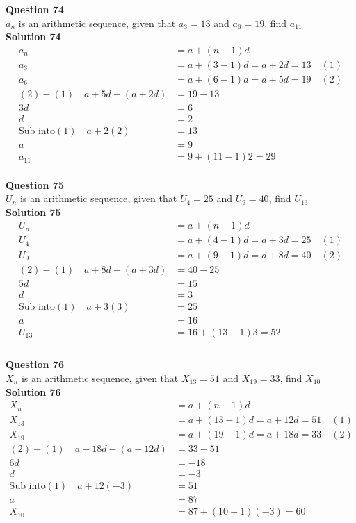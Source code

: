 \documentclass{article}
\begin{document}
\noindent\textbf{Question 74}\\[5pt]
$a_n$ is an arithmetic sequence, given that $a_3=13$ and $a_6=19$, find $a_{11}$\\[5pt]
\noindent\textbf{Solution 74}\\[5pt]
\begin{align*}
a_n&=a+(n-1)d\\[2pt]
a_3&=a+(3-1)d=a+2d=13\quad (1)\\[2pt]
a_6&=a+(6-1)d=a+5d=19\quad (2)\\[2pt]
(2)-(1)\quad a+5d-(a+2d)&=19-13\\[2pt]
3d&=6\\[2pt]
d&=2\\[12pt]
\text{Sub into} (1) \quad a+2(2)&=13\\[2pt]
a&=9\\[12pt]
a_{11}&=9+(11-1)2=29
\end{align*}\\[10pt]

\noindent\textbf{Question 75}\\[5pt]
$U_n$ is an arithmetic sequence, given that $U_4=25$ and $U_9=40$, find $U_{13}$\\[5pt]
\noindent\textbf{Solution 75}\\[5pt]
\begin{align*}
U_n&=a+(n-1)d\\[2pt]
U_4&=a+(4-1)d=a+3d=25\quad (1)\\[2pt]
U_9&=a+(9-1)d=a+8d=40\quad (2)\\[2pt]
(2)-(1)\quad a+8d-(a+3d)&=40-25\\[2pt]
5d&=15\\[2pt]
d&=3\\[12pt]
\text{Sub into} (1) \quad a+3(3)&=25\\[2pt]
a&=16\\[12pt]
U_{13}&=16+(13-1)3=52\\[-40pt]
\end{align*}\\[10pt]

\noindent\textbf{Question 76}\\[5pt]
$X_n$ is an arithmetic sequence, given that $X_{13}=51$ and $X_{19}=33$, find $X_{10}$\\[5pt]
\noindent\textbf{Solution 76}\\[5pt]
\begin{align*}
X_n&=a+(n-1)d\\[2pt]
X_{13}&=a+(13-1)d=a+12d=51\quad (1)\\[2pt]
X_{19}&=a+(19-1)d=a+18d=33\quad (2)\\[2pt]
(2)-(1)\quad a+18d-(a+12d)&=33-51\\[2pt]
6d&=-18\\[2pt]
d&=-3\\[12pt]
\text{Sub into} (1) \quad a+12(-3)&=51\\[2pt]
a&=87\\[12pt]
X_{10}&=87+(10-1)(-3)=60\\[-40pt]
\end{align*}\\[10pt]
\end{document}
